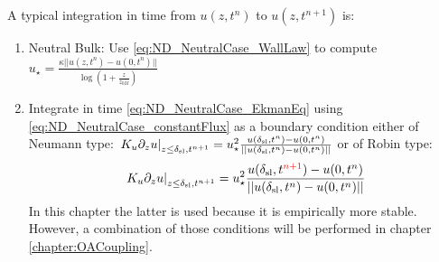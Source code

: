 A typical integration in time from $u(z, t^{n})$ to
$u(z, t^{n+1})$ is:
\begin{enumerate}
	\item Neutral Bulk: Use \eqref{eq:ND_NeutralCase_WallLaw}
	  to compute $u_\star = \frac{\kappa ||u(z, t^n)-u(0, t^n)||}
			{\log(1+\frac{z}{z_{0M}})}$
  \item Integrate in time \eqref{eq:ND_NeutralCase_EkmanEq}
  using \eqref{eq:ND_NeutralCase_constantFlux} as a boundary condition
		either of Neumann type: $\left.K_u \partial_z u
		\right|_{z\leq \delta_{\rm sl}, t^{n+1}}
		= u_\star^2 \frac{u(\delta_{\rm sl}, t^n)-u(0,t^n)}
		{||u(\delta_{\rm sl}, t^n)-u(0,t^n)||}$
		or of Robin type:
	\begin{equation}
		\left.K_u \partial_z u
		\right|_{z\leq \delta_{\rm sl}, t^{n+1}}
		= u_\star^2 \frac{u(\delta_{\rm sl},
		t^{\color{red} n+1})-u(0,t^n)}
		{||u(\delta_{\rm sl}, t^n)-u(0,t^n)||}
	\end{equation}
	In this chapter the latter is used because it is empirically
	more stable. However, a combination of those conditions
	will be performed in chapter \ref{chapter:OACoupling}.
\end{enumerate}

